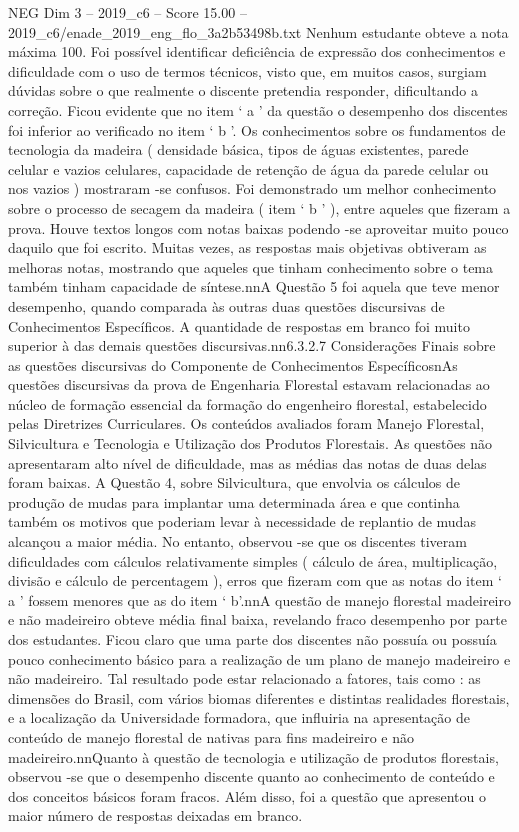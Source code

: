 \begin{textsample}{NEG Dim 3 – 2019\_c6 – Score 15.00 – 2019\_c6/enade\_2019\_eng\_flo\_3a2b53498b.txt}
Nenhum estudante obteve a nota máxima 100.
Foi possível identificar deficiência de expressão dos conhecimentos e dificuldade com o uso de termos técnicos, visto que, em muitos casos, surgiam dúvidas sobre o que realmente o discente pretendia responder, dificultando a correção.
Ficou evidente que no item ‘ a ’ da questão o desempenho dos discentes foi inferior ao verificado no item ‘ b ’.
Os conhecimentos sobre os fundamentos de tecnologia da madeira ( densidade básica, tipos de águas existentes, parede celular e vazios celulares, capacidade de retenção de água da parede celular ou nos vazios ) mostraram -se confusos.
Foi demonstrado um melhor conhecimento sobre o processo de secagem da madeira ( item ‘ b ’ ), entre aqueles que fizeram a prova.
Houve textos longos com notas baixas podendo -se aproveitar muito pouco daquilo que foi escrito.
Muitas vezes, as respostas mais objetivas obtiveram as melhoras notas, mostrando que aqueles que tinham conhecimento sobre o tema também tinham capacidade de síntese.nnA Questão 5 foi aquela que teve menor desempenho, quando comparada às outras duas questões discursivas de Conhecimentos Específicos.
A quantidade de respostas em branco foi muito superior à das demais questões discursivas.nn6.3.2.7 Considerações Finais sobre as questões discursivas do Componente de Conhecimentos EspecíficosnAs questões discursivas da prova de Engenharia Florestal estavam relacionadas ao núcleo de formação essencial da formação do engenheiro florestal, estabelecido pelas Diretrizes Curriculares.
Os conteúdos avaliados foram Manejo Florestal, Silvicultura e Tecnologia e Utilização dos Produtos Florestais.
As questões não apresentaram alto nível de dificuldade, mas as médias das notas de duas delas foram baixas.
A Questão 4, sobre Silvicultura, que envolvia os cálculos de produção de mudas para implantar uma determinada área e que continha também os motivos que poderiam levar à necessidade de replantio de mudas alcançou a maior média.
No entanto, observou -se que os discentes tiveram dificuldades com cálculos relativamente simples ( cálculo de área, multiplicação, divisão e cálculo de percentagem ), erros que fizeram com que as notas do item ‘ a ’ fossem menores que as do item ‘ b’.nnA questão de manejo florestal madeireiro e não madeireiro obteve média final baixa, revelando fraco desempenho por parte dos estudantes.
Ficou claro que uma parte dos discentes não possuía ou possuía pouco conhecimento básico para a realização de um plano de manejo madeireiro e não madeireiro.
Tal resultado pode estar relacionado a fatores, tais como : as dimensões do Brasil, com vários biomas diferentes e distintas realidades florestais, e a localização da Universidade formadora, que influiria na apresentação de conteúdo de manejo florestal de nativas para fins madeireiro e não madeireiro.nnQuanto à questão de tecnologia e utilização de produtos florestais, observou -se que o desempenho discente quanto ao conhecimento de conteúdo e dos conceitos básicos foram fracos.
Além disso, foi a questão que apresentou o maior número de respostas deixadas em branco.

\end{textsample}
